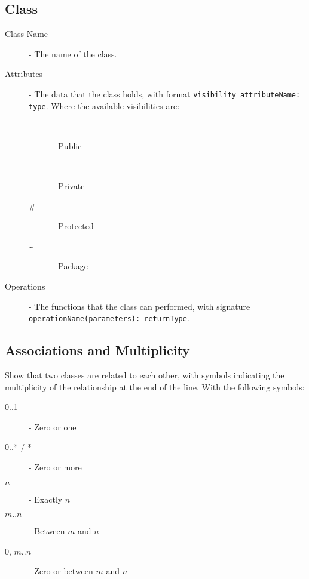 \documentclass[12pt letter]{report}
\begin{document}
\subsection{Class}

\begin{description}
  \item[Class Name] - The name of the class.
  \item[Attributes] - The data that the class holds, with format \lstinline{visibility attributeName: type}. Where the available visibilities are:
        \begin{description}
          \item[+] - Public
          \item[-] - Private
          \item[\#] - Protected
          \item[\~] - Package
        \end{description}
  \item[Operations] - The functions that the class can performed, with signature \lstinline{operationName(parameters): returnType}.
\end{description}

%

\subsection{Associations and Multiplicity}
Show that two classes are related to each other, with symbols indicating the multiplicity of the relationship at the end of the line. With the following symbols:
\begin{description}
  \item[0..1] - Zero or one
  \item[0..* / *] - Zero or more
  \item[$n$] - Exactly $n$
  \item[$m..n$] - Between $m$ and $n$
  \item[0, $m..n$] - Zero or between $m$ and $n$
\end{description}
\end{document}
